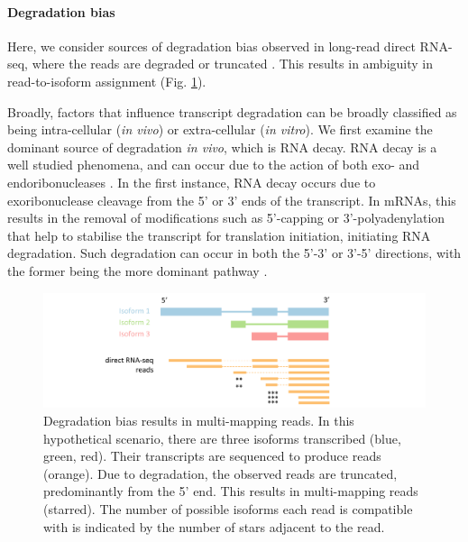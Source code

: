 \paragraph{Degradation bias} Here, we consider sources of degradation bias observed in long-read direct RNA-seq, where the reads are degraded or truncated \cite{Soneson2019, Workman2019}. This results in ambiguity in read-to-isoform assignment \cite{Soneson2019} (Fig. \ref{fig:degbias}). 

Broadly, factors that influence transcript degradation can be broadly classified as being intra-cellular (\textit{in vivo}) or extra-cellular (\textit{in vitro}). We first examine the dominant source of degradation \textit{in vivo}, which is RNA decay. RNA decay is a well studied phenomena, and can occur due to the action of both exo- and endoribonucleases \cite{CONTI2005, Garneau2007, HOUSELEY2009, Keene2010}. In the first instance, RNA decay occurs due to exoribonuclease cleavage from the 5’ or 3’ ends of the transcript. In mRNAs, this results in the removal of modifications such as 5’-capping or 3’-polyadenylation that help to stabilise the transcript for translation initiation, initiating RNA degradation. Such degradation can occur in both the 5’-3’ or 3’-5’ directions, with the former being the more dominant pathway \cite{Garneau2007}.  

\begin{figure}[H]
    \centering
    \includegraphics[width=\textwidth]{figures/sec-1-degbias.png}
    \caption[Degradation bias results in multi-mapping reads]{Degradation bias results in multi-mapping reads. In this hypothetical scenario, there are three isoforms transcribed (blue, green, red). Their transcripts are sequenced to produce reads (orange). Due to degradation, the observed reads are truncated, predominantly from the 5' end. This results in multi-mapping reads (starred). The number of possible isoforms each read is compatible with is indicated by the number of stars adjacent to the read.}
    \label{fig:degbias}
\end{figure}

